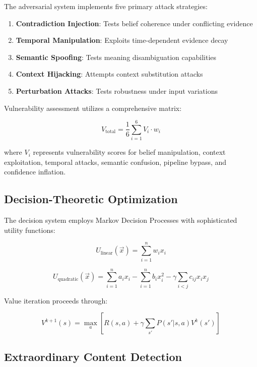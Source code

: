 \documentclass[12pt,a4paper]{article}
\begin{document}
The adversarial system implements five primary attack strategies:

\begin{enumerate}
    \item \textbf{Contradiction Injection}: Tests belief coherence under conflicting evidence
    \item \textbf{Temporal Manipulation}: Exploits time-dependent evidence decay
    \item \textbf{Semantic Spoofing}: Tests meaning disambiguation capabilities
    \item \textbf{Context Hijacking}: Attempts context substitution attacks
    \item \textbf{Perturbation Attacks}: Tests robustness under input variations
\end{enumerate}

Vulnerability assessment utilizes a comprehensive matrix:

\begin{equation}
V_{\text{total}} = \frac{1}{6}\sum_{i=1}^{6} V_i \cdot w_i
\end{equation}

where $V_i$ represents vulnerability scores for belief manipulation, context exploitation, temporal attacks, semantic confusion, pipeline bypass, and confidence inflation.

\subsection{Decision-Theoretic Optimization}

The decision system employs Markov Decision Processes with sophisticated utility functions:

\begin{equation}
U_{\text{linear}}(\vec{x}) = \sum_{i=1}^{n} w_i x_i
\end{equation}

\begin{equation}
U_{\text{quadratic}}(\vec{x}) = \sum_{i=1}^{n} a_i x_i - \sum_{i=1}^{n} b_i x_i^2 - \gamma \sum_{i<j} c_{ij} x_i x_j
\end{equation}

Value iteration proceeds through:

\begin{equation}
V^{k+1}(s) = \max_a \left[ R(s,a) + \gamma \sum_{s'} P(s'|s,a) V^k(s') \right]
\end{equation}

\subsection{Extraordinary Content Detection}
\end{document}
